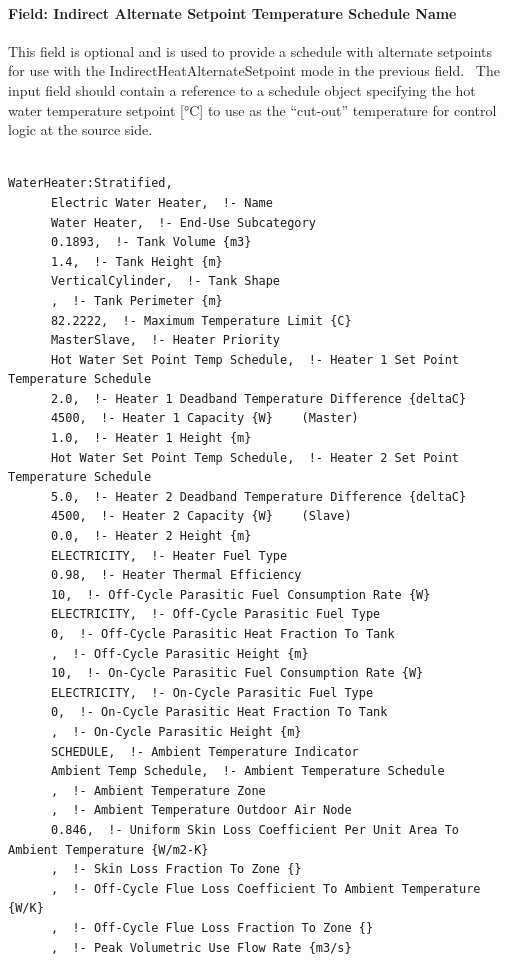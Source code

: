 \paragraph{Field: Indirect Alternate Setpoint Temperature Schedule Name}\label{field-indirect-alternate-setpoint-temperature-schedule-name-1}

This field is optional and is used to provide a schedule with alternate setpoints for use with the IndirectHeatAlternateSetpoint mode in the previous field.~ The input field should contain a reference to a schedule object specifying the hot water temperature setpoint {[}°C{]} to use as the ``cut-out'' temperature for control logic at the source side.

\begin{lstlisting}

WaterHeater:Stratified,
      Electric Water Heater,  !- Name
      Water Heater,  !- End-Use Subcategory
      0.1893,  !- Tank Volume {m3}
      1.4,  !- Tank Height {m}
      VerticalCylinder,  !- Tank Shape
      ,  !- Tank Perimeter {m}
      82.2222,  !- Maximum Temperature Limit {C}
      MasterSlave,  !- Heater Priority
      Hot Water Set Point Temp Schedule,  !- Heater 1 Set Point Temperature Schedule
      2.0,  !- Heater 1 Deadband Temperature Difference {deltaC}
      4500,  !- Heater 1 Capacity {W}    (Master)
      1.0,  !- Heater 1 Height {m}
      Hot Water Set Point Temp Schedule,  !- Heater 2 Set Point Temperature Schedule
      5.0,  !- Heater 2 Deadband Temperature Difference {deltaC}
      4500,  !- Heater 2 Capacity {W}    (Slave)
      0.0,  !- Heater 2 Height {m}
      ELECTRICITY,  !- Heater Fuel Type
      0.98,  !- Heater Thermal Efficiency
      10,  !- Off-Cycle Parasitic Fuel Consumption Rate {W}
      ELECTRICITY,  !- Off-Cycle Parasitic Fuel Type
      0,  !- Off-Cycle Parasitic Heat Fraction To Tank
      ,  !- Off-Cycle Parasitic Height {m}
      10,  !- On-Cycle Parasitic Fuel Consumption Rate {W}
      ELECTRICITY,  !- On-Cycle Parasitic Fuel Type
      0,  !- On-Cycle Parasitic Heat Fraction To Tank
      ,  !- On-Cycle Parasitic Height {m}
      SCHEDULE,  !- Ambient Temperature Indicator
      Ambient Temp Schedule,  !- Ambient Temperature Schedule
      ,  !- Ambient Temperature Zone
      ,  !- Ambient Temperature Outdoor Air Node
      0.846,  !- Uniform Skin Loss Coefficient Per Unit Area To Ambient Temperature {W/m2-K}
      ,  !- Skin Loss Fraction To Zone {}
      ,  !- Off-Cycle Flue Loss Coefficient To Ambient Temperature {W/K}
      ,  !- Off-Cycle Flue Loss Fraction To Zone {}
      ,  !- Peak Volumetric Use Flow Rate {m3/s}

\end{lstlisting}
